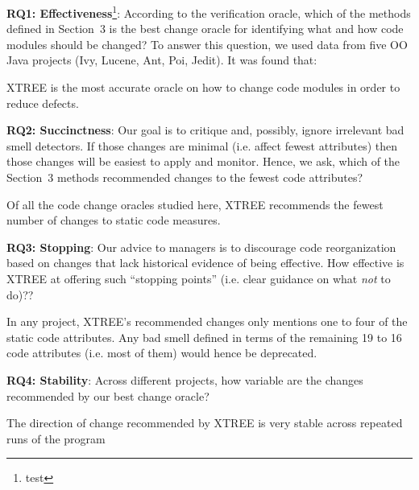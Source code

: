 \documentclass[twocolumn,5p]{elsarticle}
\theoremstyle{break}
\begin{document}
	{\bf  RQ1: Effectiveness}\footnote{test}: According to the verification oracle, which of the methods  defined in Section~3 is the best  change oracle for identifying what and how
	code modules should be changed? To answer this question, we used data from five OO Java projects
	(Ivy, Lucene, Ant, Poi, Jedit). It was found that:
	\begin{lesson}
		XTREE is the most accurate oracle on how to change code modules in order to reduce defects.
	\end{lesson}
	
	{\bf RQ2: Succinctness}: Our goal is to critique and, possibly,
	ignore irrelevant bad smell detectors.  If those changes are minimal (i.e. affect fewest attributes) then those changes
	will be easiest to apply and monitor. Hence, we ask, which of the Section~3 methods recommended changes to the fewest
	code attributes?
	\begin{lesson}
		Of all the code change oracles studied here, XTREE recommends the fewest number of changes to static code measures.
	\end{lesson}
	
	{\bf RQ3: Stopping}: Our advice to managers is to discourage code reorganization based on changes that lack
	historical evidence of being effective. How effective is XTREE at offering such ``stopping points'' (i.e. clear guidance on what {\em not} to do)??
	\begin{lesson}
		In  any  project,  XTREE's  recommended  changes  only  mentions one to four 
		of the  static code attributes.  Any bad smell defined in terms of the remaining 19 to 16 code attributes (i.e. most of them)
		would hence be deprecated.
	\end{lesson}
	
	{\bf RQ4: Stability}: Across different projects, how variable are the changes recommended by our best change oracle?
	\begin{lesson}
		The direction of change recommended by XTREE is  very stable across repeated runs of the program 
	\end{lesson} 
	
\end{document}
